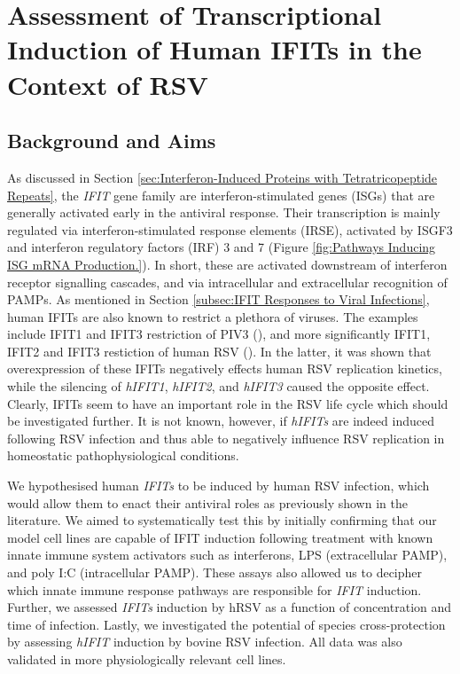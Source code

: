 \chapter{Assessment of Transcriptional Induction of Human IFITs in the Context of RSV} \label{ch:Assessment of Transcriptional Induction of Human IFITs in the Context of RSV}
\section{Background and Aims} \label{sec:Background and Aims-Chapter 1}
As discussed in Section \ref{sec:Interferon-Induced Proteins with Tetratricopeptide Repeats}, the \textit{IFIT} gene family are interferon-stimulated genes (ISGs) that are generally activated early in the antiviral response. Their transcription is mainly regulated via interferon-stimulated response elements (IRSE), activated by ISGF3 and interferon regulatory factors (IRF) 3 and 7 (Figure \ref{fig:Pathways Inducing ISG mRNA Production.}). In short, these are activated downstream of interferon receptor signalling cascades, and via intracellular and extracellular recognition of PAMPs. As mentioned in Section \ref{subsec:IFIT Responses to Viral Infections}, human IFITs are also known to restrict a plethora of viruses. The examples include IFIT1 and IFIT3 restriction of PIV3 (\cite{Rabbani2016Identification3}), and more significantly IFIT1, IFIT2 and IFIT3 restiction of human RSV (\cite{Drori2020InfluenzaProteins}). In the latter, it was shown that overexpression of these IFITs negatively effects human RSV replication kinetics, while the silencing of \textit{hIFIT1}, \textit{hIFIT2}, and \textit{hIFIT3} caused the opposite effect. Clearly, IFITs seem to have an important role in the RSV life cycle which should be investigated further. It is not known, however, if \textit{hIFITs} are indeed induced following RSV infection and thus able to negatively influence RSV replication in homeostatic pathophysiological conditions.

We hypothesised human \textit{IFITs} to be induced by human RSV infection, which would allow them to enact their antiviral roles as previously shown in the literature. We aimed to systematically test this by initially confirming that our model cell lines are capable of IFIT induction following treatment with known innate immune system activators such as interferons, LPS (extracellular PAMP), and poly I:C (intracellular PAMP). These assays also allowed us to decipher which innate immune response pathways are responsible for \textit{IFIT} induction. Further, we assessed \textit{IFITs} induction by hRSV as a function of concentration and time of infection. Lastly, we investigated the potential of species cross-protection by assessing \textit{hIFIT} induction by bovine RSV infection. All data was also validated in more physiologically relevant cell lines. 

